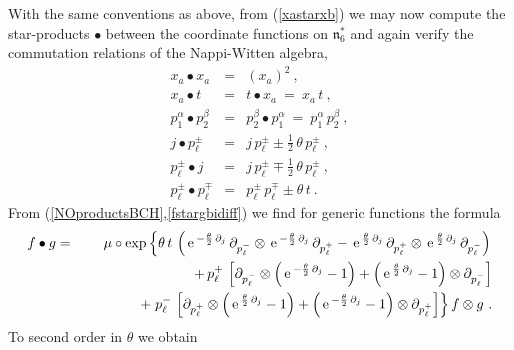 \documentclass[11pt,a4paper]{article}
\def\mfn{{\mathfrak n}}
\def\e{{\,\rm e}\,}
\def\bea{\begin{eqnarray}}
\def\eea{\end{eqnarray}}
\begin{document}
With the same conventions as above, from (\ref{xastarxb}) we may now
compute the star-products $\bullet$ between the coordinate functions
on $\mfn_6^*$ and again verify the commutation relations of the
Nappi-Witten algebra,
\bea
x_a\bullet x_a&=&(x_a)^2 \ , \nonumber\\
x_a\bullet t&=&t\bullet x_a~=~x_a\,t \ ,
\nonumber\\p_1^\alpha\bullet p_2^\beta&=&p_2^\beta\bullet p_1^\alpha
~=~p_1^\alpha\,p_2^\beta \ , \nonumber\\
j\bullet p_\ell^\pm&=&j\,p_\ell^\pm\pm\mbox{$\frac12$}\,
\theta\,p_\ell^\pm \ , \nonumber\\
p_\ell^\pm\bullet j&=&j\,p_\ell^\pm\mp\mbox{$\frac12$}\,
\theta\,p_\ell^\pm \ , \nonumber\\
p_\ell^\pm\bullet p_\ell^\mp&=&p_\ell^\pm\,p_\ell^\mp\pm\theta\,t \ .
\label{TOsymcoordstarprods}\eea
From (\ref{NOproductsBCH},\ref{fstargbidiff}) we find for generic
functions the formula
\bea
f\bullet g&=&\mu\circ\exp\left\{\theta\,t\,\left(\e^{-\frac\theta2
\,\partial_j}\,
\partial_{p_\ell^-}\otimes\e^{-\frac\theta2\,\partial_j}\,
\partial_{p_\ell^+}-\e^{\frac\theta2\,\partial_j}\,
\partial_{p_\ell^+}\otimes\e^{\frac\theta2\,\partial_j}\,
\partial_{p_\ell^-}\right)\right.\nonumber
\\&&\qquad\qquad+\,p_\ell^+\,\left[\partial_{p_\ell^-}\otimes
\left(\e^{-\frac\theta2\,\partial_j}-1\right)
+\left(\e^{\frac\theta2\,\partial_j}-1\right)\otimes
\partial_{p_\ell^-}\right]\nonumber\\&&\qquad\qquad+\left.
p_\ell^-\,\left[\partial_{p_\ell^+}\otimes
\left(\e^{\frac\theta2\,\partial_j}-1\right)
+\left(\e^{-\frac\theta2\,\partial_j}-1\right)
\otimes\partial_{p_\ell^+}\right]\right\}f\otimes g \ .
\label{TOsymstargen}\eea
To second order in $\theta$ we obtain
\end{document}

